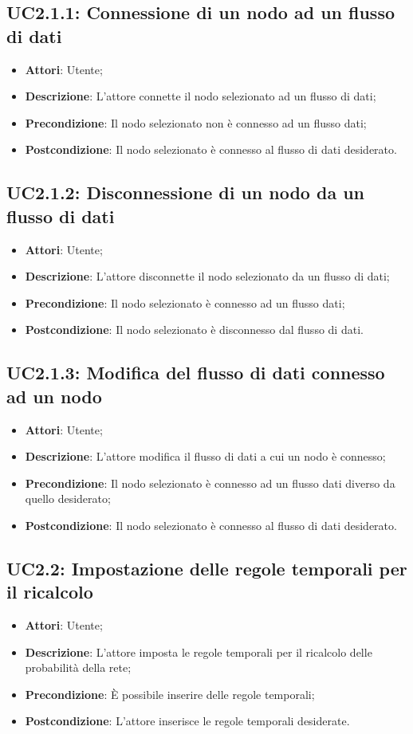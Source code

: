\subsection{UC2.1.1: Connessione di un nodo ad un flusso di dati}
\hypertarget{UC2.1.1}{}
\begin{itemize}
	\item \textbf{Attori}: Utente;
	\item \textbf{Descrizione}: L'attore connette il nodo selezionato ad un flusso di dati;
	\item \textbf{Precondizione}: Il nodo selezionato non è connesso ad un flusso dati;
	\item \textbf{Postcondizione}: Il nodo selezionato è connesso al flusso di dati desiderato.
\end{itemize}

\subsection{UC2.1.2: Disconnessione di un nodo da un flusso di dati}
\hypertarget{UC2.1.2}{}
\begin{itemize}
	\item \textbf{Attori}: Utente;
	\item \textbf{Descrizione}: L'attore disconnette il nodo selezionato da un flusso di dati;
	\item \textbf{Precondizione}: Il nodo selezionato è connesso ad un flusso dati;
	\item \textbf{Postcondizione}: Il nodo selezionato è disconnesso dal flusso di dati.
\end{itemize}

\subsection{UC2.1.3: Modifica del flusso di dati connesso ad un nodo}
\hypertarget{UC2.1.3}{}
\begin{itemize}
	\item \textbf{Attori}: Utente;
	\item \textbf{Descrizione}: L'attore modifica il flusso di dati a cui un nodo è connesso;
	\item \textbf{Precondizione}: Il nodo selezionato è connesso ad un flusso dati diverso da quello desiderato;
	\item \textbf{Postcondizione}: Il nodo selezionato è connesso al flusso di dati desiderato.
\end{itemize}
\subsection{UC2.2: Impostazione delle regole temporali per il ricalcolo}
\hypertarget{UC2.2}{}
\begin{itemize}
	\item \textbf{Attori}: Utente;
	\item \textbf{Descrizione}: L'attore imposta le regole temporali per il ricalcolo delle probabilità della rete;
	\item \textbf{Precondizione}: È possibile inserire delle regole temporali;
	\item \textbf{Postcondizione}: L'attore inserisce le regole temporali desiderate.
\end{itemize}

